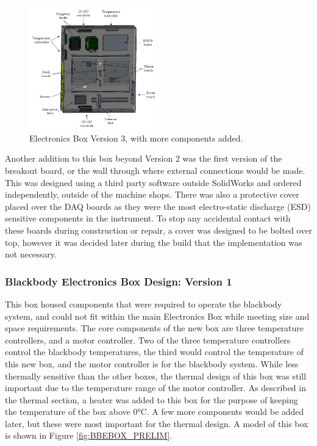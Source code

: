 \begin{figure}
    \centering
    \includegraphics[width=0.5\textwidth]{chap3_images/LIFE_V5_initial_images/Ebox_V3_init_labelled.JPG}
    \caption{Electronics Box Version 3, with more components added.}
    \label{fig:EBOX_V3}
\end{figure}

Another addition to this box beyond Version 2 was the first version of the breakout board, or the wall through where external connections would be made. This was designed using a third party software outside SolidWorks and ordered independently, outside of the machine shops. There was also a protective cover placed over the DAQ boards as they were the most electro-static discharge (ESD) sensitive components in the instrument. To stop any accidental contact with these boards during construction or repair, a cover was designed to be bolted over top, however it was decided later during the build that the implementation was not necessary. 

\subsubsection{Blackbody Electronics Box Design: Version 1}
This box housed components that were required to operate the blackbody system, and could not fit within the main Electronics Box while meeting size and space requirements. The core components of the new box are three temperature controllers, and a motor controller. Two of the three temperature controllers control the blackbody temperatures, the third would control the temperature of this new box, and the motor controller is for the blackbody system. While less thermally sensitive than the other boxes, the thermal design of this box was still important due to the temperature range of the motor controller. As described in the thermal section, a heater was added to this box for the purpose of keeping the temperature of the box above 0°C. A few more components would be added later, but these were most important for the thermal design. A model of this box is shown in Figure \ref{fig:BBEBOX_PRELIM}.

